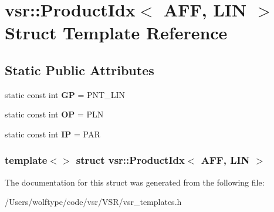 \hypertarget{structvsr_1_1_product_idx_3_01_a_f_f_00_01_l_i_n_01_4}{\section{vsr\-:\-:Product\-Idx$<$ A\-F\-F, L\-I\-N $>$ Struct Template Reference}
\label{structvsr_1_1_product_idx_3_01_a_f_f_00_01_l_i_n_01_4}
}
\subsection*{Static Public Attributes}
\begin{DoxyCompactItemize}
\item 
\hypertarget{structvsr_1_1_product_idx_3_01_a_f_f_00_01_l_i_n_01_4_a4bf2cbace24e57ab9a4902a8b9894e08}{static const int {\bfseries G\-P} = P\-N\-T\-\_\-\-L\-I\-N}\label{structvsr_1_1_product_idx_3_01_a_f_f_00_01_l_i_n_01_4_a4bf2cbace24e57ab9a4902a8b9894e08}

\item 
\hypertarget{structvsr_1_1_product_idx_3_01_a_f_f_00_01_l_i_n_01_4_af2bf5842dbb797336f250a8367865f3c}{static const int {\bfseries O\-P} = P\-L\-N}\label{structvsr_1_1_product_idx_3_01_a_f_f_00_01_l_i_n_01_4_af2bf5842dbb797336f250a8367865f3c}

\item 
\hypertarget{structvsr_1_1_product_idx_3_01_a_f_f_00_01_l_i_n_01_4_af9fef63f79aefe36b92c2f8d1d8f2927}{static const int {\bfseries I\-P} = P\-A\-R}\label{structvsr_1_1_product_idx_3_01_a_f_f_00_01_l_i_n_01_4_af9fef63f79aefe36b92c2f8d1d8f2927}

\end{DoxyCompactItemize}
\subsubsection*{template$<$$>$ struct vsr\-::\-Product\-Idx$<$ A\-F\-F, L\-I\-N $>$}



The documentation for this struct was generated from the following file\-:\begin{DoxyCompactItemize}
\item 
/\-Users/wolftype/code/vsr/\-V\-S\-R/vsr\-\_\-templates.\-h\end{DoxyCompactItemize}
